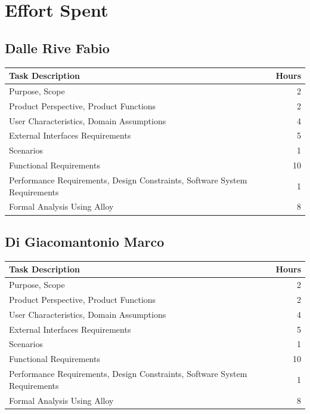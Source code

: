 \documentclass{article}
\begin{document}
\section{Effort Spent}
\subsection{Dalle Rive Fabio}
\begin{center}
    \begin{tabular}{ | l | r |}
    \hline
    \textbf{Task Description} & \textbf{Hours} \\ \hline
    Purpose, Scope & 2\\ \hline
   	Product Perspective, Product Functions & 2\\ \hline
    User Characteristics, Domain Assumptions & 4\\ \hline
    External Interfaces Requirements & 5\\ \hline
    Scenarios & 1\\ \hline
    Functional Requirements & 10\\ \hline
    Performance Requirements, Design Constraints, Software System Requirements & 1\\ \hline
    Formal Analysis Using Alloy & 8\\ \hline
    \end{tabular}
\end{center}
\subsection{Di Giacomantonio Marco}
\begin{center}
    \begin{tabular}{ | l | r |}
    \hline
    \textbf{Task Description} & \textbf{Hours} \\ \hline
    Purpose, Scope & 2\\ \hline
   	Product Perspective, Product Functions & 2\\ \hline
    User Characteristics, Domain Assumptions & 4\\ \hline
    External Interfaces Requirements & 5\\ \hline
    Scenarios & 1\\ \hline
    Functional Requirements & 10\\ \hline
    Performance Requirements, Design Constraints, Software System Requirements & 1\\ \hline
    Formal Analysis Using Alloy & 8\\ \hline
    \end{tabular}
\end{center}
\newpage
\end{document}
